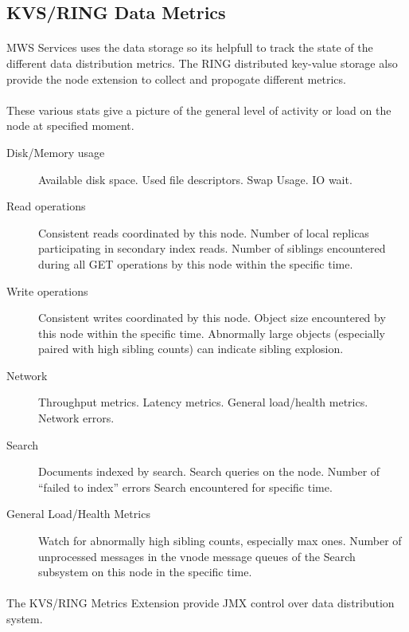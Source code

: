 \subsection*{KVS/RING Data Metrics}

\paragraph{}
MWS Services uses the data storage so its helpfull to track the state of the different data distribution metrics.
The RING distributed key-value storage also provide the node extension to collect and propogate different metrics.

\paragraph{}
These various stats give a picture of the general level of activity or load on the node at specified moment.

\begin{description}
\item [Disk/Memory usage]
Available disk space. Used file descriptors. Swap Usage. IO wait.
\item [Read operations]
Consistent reads coordinated by this node. Number of local replicas participating in secondary index reads.
Number of siblings encountered during all GET operations by this node within the specific time.
\item [Write operations]
Consistent writes coordinated by this node.
Object size encountered by this node within the specific time.
Abnormally large objects (especially paired with high sibling counts) can indicate sibling explosion.
\item [Network]
Throughput metrics. Latency metrics. General load/health metrics. Network errors.
\item [Search]
Documents indexed by search. Search queries on the node. Number of “failed to index” errors Search encountered for specific time.
\item [General Load/Health Metrics]
Watch for abnormally high sibling counts, especially max ones.
Number of unprocessed messages in the vnode message queues of the Search subsystem on this node in the specific time.
\end{description}

\paragraph{}
The KVS/RING Metrics Extension provide JMX control over data distribution system.
